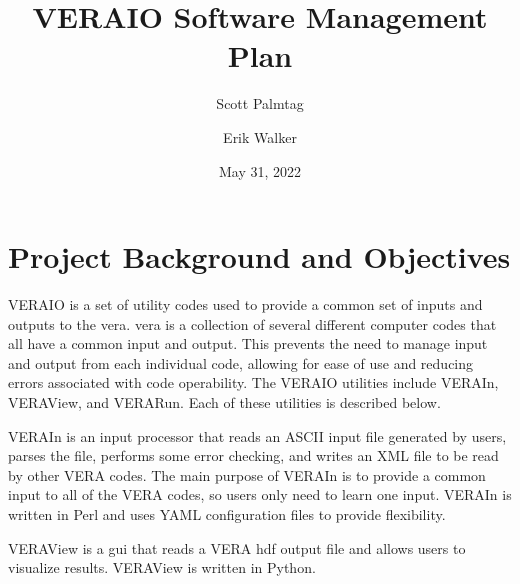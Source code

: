 \documentclass{vera-ornltm}
\author[1]{Scott Palmtag}
\affil[1]{North Carolina State University}
\author[2]{Erik Walker}
\affil[2]{Oak Ridge National Laboratory}
\title{VERAIO Software Management Plan}
\date{May 31, 2022}
\renewcommand{\marginpar}[1]{{\small\em\color{note}[#1]}}
\begin{document}
\frontmatter



\tableofcontents
\printacronyms[title=Abbreviations]

\mainmatter
\section{Project Background and Objectives}

VERAIO is a set of utility codes used to provide a common set of inputs and outputs to the \ac{vera}.
\ac{vera} is a collection of several different computer codes that all have a common input and output. This prevents the need to manage input and output from each individual code, allowing for ease of use 
and reducing errors associated with code operability.
The VERAIO utilities include VERAIn, VERAView, and VERARun. Each of these utilities is described below.

VERAIn is an input processor that reads an ASCII input file generated by users, parses the file,
performs some error checking, and writes an XML file to be read by other VERA codes.
The main purpose of VERAIn is to provide a common input to all of the VERA codes, so users only need
to learn one input. VERAIn is written in Perl and uses YAML configuration files to provide flexibility.

VERAView is a \ac{gui} that reads a VERA \ac{hdf} output file and allows users to visualize results.
VERAView is written in Python.
\end{document}

